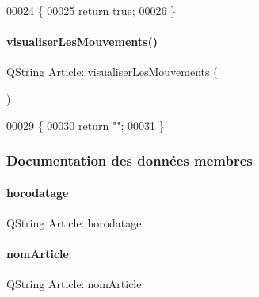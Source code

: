 \begin{DoxyCode}
00024 \{
00025     \textcolor{keywordflow}{return} \textcolor{keyword}{true};
00026 \}
\end{DoxyCode}
\mbox{\label{class_article_a47f169939af6d2d3e840392c85c88121}} 
\paragraph{\texorpdfstring{visualiser\+Les\+Mouvements()}{visualiserLesMouvements()}}
{\footnotesize\ttfamily Q\+String Article\+::visualiser\+Les\+Mouvements (\begin{DoxyParamCaption}{ }\end{DoxyParamCaption})}


\begin{DoxyCode}
00029 \{
00030     \textcolor{keywordflow}{return} \textcolor{stringliteral}{""};
00031 \}
\end{DoxyCode}


\subsubsection{Documentation des données membres}
\mbox{\label{class_article_ae7a9ee7f0b2bd423ff995819fa78ac17}} 
\paragraph{\texorpdfstring{horodatage}{horodatage}}
{\footnotesize\ttfamily Q\+String Article\+::horodatage\hspace{0.3cm}{\ttfamily [private]}}

\mbox{\label{class_article_a0ba6c08f7dd54e4b7caf673ecd6b41a6}} 
\paragraph{\texorpdfstring{nom\+Article}{nomArticle}}
{\footnotesize\ttfamily Q\+String Article\+::nom\+Article\hspace{0.3cm}{\ttfamily [private]}}

